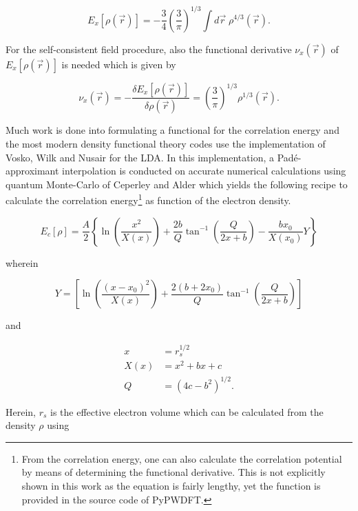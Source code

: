 \begin{equation}
E_{x}[\rho(\vec{r})] = -\frac{3}{4}\left(\frac{3}{\pi}\right)^{1/3} \int d\vec{r}\; \rho^{4/3}(\vec{r}).
\label{eq:chap04:slater_exchange}
\end{equation}

For the self-consistent field procedure, also the functional derivative $\nu_{x}(\vec{r})$ of $E_{x}[\rho(\vec{r})]$ is needed which is given by

\begin{equation}
\nu_{x}(\vec{r}) = -\frac{\delta E_{x}[\rho(\vec{r})]}{\delta \rho(\vec{r})} = \left(\frac{3}{\pi}\right)^{1/3} \rho^{1/3}(\vec{r}).
\end{equation}

Much work is done into formulating a functional for the correlation energy and the most modern density functional theory codes use the implementation of Vosko, Wilk and Nusair for the LDA. In this implementation, a Padé-approximant interpolation is conducted on accurate numerical calculations using quantum Monte-Carlo of Ceperley and Alder which yields the following recipe to calculate the correlation energy\footnote{From the correlation energy, one can also calculate the correlation potential by means of determining the functional derivative. This is not explicitly shown in this work as the equation is fairly lengthy, yet the function is provided in the source code of PyPWDFT.} as function of the electron density.\cite{1980:vosko,1980:ceperley}

\begin{equation}
E_{c}[\rho] = \frac{A}{2} \left\{ \ln \left( \frac{x^{2}}{X(x)} \right) + \frac{2b}{Q} \tan^{-1} \left( \frac{Q}{2x+b} \right) -\frac{bx_{0}}{X(x_{0})} Y \right\}
\label{eq:vwn5}
\end{equation}

wherein

\begin{equation}
    Y = \left[ \ln \left( \frac{(x-x_{0})^{2}}{X(x)} \right) + \frac{2(b+2x_{0})}{Q} \tan^{-1} \left( \frac{Q}{2x+b} \right) \right]
\end{equation}

and

\begin{align}
	x &= r_{s}^{1/2} \\
	X(x) &= x^{2} + bx + c \\
	Q &= \left(4c - b^{2}\right)^{1/2}.
\end{align}

Herein, $r_{s}$ is the effective electron volume which can be calculated from the density $\rho$ using

